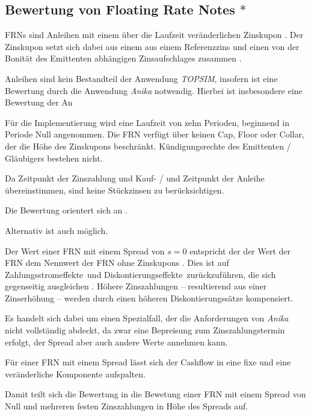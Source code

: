 \documentclass[12pt, a4paper]{article}
\begin{document}
\subsection{Bewertung von Floating Rate Notes $\ast$}
\label{sec:bewertung_von_floating_rate_notes}
\glspl{FRN} sind Anleihen mit einem über die Laufzeit veränderlichen Zinskupon \autocite[][373]{fabozzi_handbook_2005}. Der Zinskupon setzt sich dabei aus einem aus einem Referenzzins und einen von der Bonität des Emittenten abhängigen Zinsaufschlages zusammen \autocite[][374]{fabozzi_handbook_2005}.

Anleihen sind kein Bestandteil der Anwendung \textit{TOPSIM}, insofern ist eine Bewertung durch die Anwendung \textit{Anika} notwendig.
Hierbei ist insbesondere eine Bewertung der An

Für die Implementierung wird eine Laufzeit von zehn Perioden, beginnend in Periode Null angenommen.
Die \gls{FRN} verfügt über keinen Cap, Floor oder Collar, der die Höhe des Zinskupons beschränkt.
Kündigungsrechte des Emittenten / Gläubigers bestehen nicht.

Da Zeitpunkt der Zinszahlung und Kauf- / und Zeitpunkt der Anleihe übereinstimmen, sind keine Stückzinsen zu berücksichtigen.

Die Bewertung orientert sich an \autocite[][]{veronesi_fixed_2010}.

Alternativ ist auch \autocite[][]{fabozzi_handbook_2005} möglich.

Der Wert einer \gls{FRN} mit einem Spread von $s=0$ entspricht der der Wert der \gls{FRN} dem Nennwert der \gls{FRN} ohne Zinskupons \autocite[][S.~52~f.]{veronesi_fixed_2010}. Dies ist auf \glqq Zahlungsstromeffekte\grqq~und \glqq Diskontierungseffekte\grqq~zurückzuführen, die sich gegenseitig ausgleichen \autocite[][S.~54]{veronesi_fixed_2010}. Höhere Zinszahlungen -- resultierend aus einer Zinserhöhung -- werden durch einen höheren Diskontierungssätze kompensiert.

Es handelt sich dabei um einen Spezialfall, der die Anforderungen von \textit{Anika} nicht vollständig abdeckt, da zwar eine Bepreisung zum Zinszahlungstermin erfolgt, der Spread aber auch andere Werte annehmen kann.

Für einer \gls{FRN} mit einem Spread lässt sich der Cashflow in eine fixe und eine veränderliche Komponente aufspalten.

Damit teilt sich die Bewertung in die Bewetung einer \gls{FRN} mit einem Spread von Null und mehreren festen Zinszahlungen in Höhe des Spreads auf.
\end{document}
